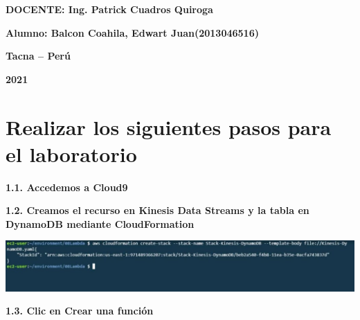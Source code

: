 \documentclass{article}
\begin{document}
\begin{titlepage}
\begin{center}
\vspace*{0.3in}
\begin{Large}
\textbf{DOCENTE: Ing. Patrick Cuadros Quiroga} \\
\end{Large}

\vspace*{0.2in}
\vspace*{0.1in}
\begin{large}

\begin{Large}
\textbf{Alumno: Balcon Coahila, Edwart Juan\hfill	(2013046516) } \\
\end{Large}

\vspace*{0.15in}
\begin{Large}
\textbf{Tacna – Perú} \\
\end{Large}

\vspace*{0.05in}
\begin{Large}
\textbf{2021 } \\
\end{Large}

\end{large}
\end{center}

\end{titlepage}


\newpage

\section{ Realizar los siguientes pasos para el laboratorio }

\textbf{1.1.  Accedemos a Cloud9}

	
\textbf{1.2. Creamos el recurso en Kinesis Data Streams y la tabla en DynamoDB mediante CloudFormation}


    \begin{center}
		\includegraphics[width=15cm]{./images/1} 
	\end{center}

\textbf{1.3.   Clic en Crear una función
}
\end{document}
